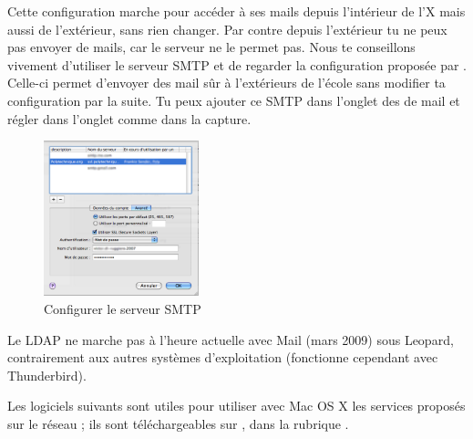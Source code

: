 Cette configuration marche pour accéder à ses mails depuis l'intérieur de l'X mais aussi de l'extérieur, sans rien changer. Par contre depuis l'extérieur tu ne peux pas envoyer de mails, car le serveur  ne le permet pas. Nous te conseillons vivement d'utiliser le serveur SMTP  et de regarder la configuration proposée par . Celle-ci permet d'envoyer des mail sûr à l'extérieurs de l'école sans modifier ta configuration par la suite. Tu peux ajouter ce SMTP dans l'onglet  des  de mail et régler dans l'onglet  comme dans la capture.

\begin{figure}[!hl]
    \begin{center}

	      \includegraphics[width=0.4\textwidth]{images/mac_config_smtp_poltechnique.png} 
      \caption{Configurer le serveur SMTP }
    \end{center}
  \end{figure}



Le LDAP ne marche pas à l'heure actuelle avec Mail (mars 2009) sous Leopard, contrairement aux  autres systèmes d'exploitation (fonctionne cependant avec Thunderbird).



Les logiciels suivants sont utiles pour utiliser avec Mac OS X les services proposés sur le réseau ; ils sont téléchargeables sur , dans la rubrique .


